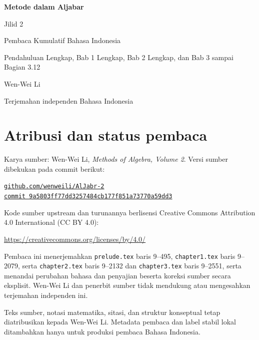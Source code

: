 \documentclass[
  colors=true,
  fontsetup=font-setup-id.tex,
  titlesetup=titles-setup.tex
]{AJbook2}
\theoremstyle{plain}
\theoremstyle{nonumberplain}
\numberwithin{equation}{section}
\numberwithin{figure}{section}
\begin{document}
\begin{titlepage}
  \centering
  \vspace*{0.16\textheight}
  {\Huge\bfseries Metode dalam Aljabar\par}
  \vspace{0.8em}
  {\LARGE Jilid 2\par}
  \vspace{1.8em}
  {\Large Pembaca Kumulatif Bahasa Indonesia\par}
  \vspace{0.6em}
  {\large Pendahuluan Lengkap, Bab 1 Lengkap, Bab 2 Lengkap, dan Bab 3 sampai Bagian 3.12\par}
  \vfill
  {\Large Wen-Wei Li\par}
  \vspace{0.6em}
  {\normalsize Terjemahan independen Bahasa Indonesia\par}
  \vspace*{0.10\textheight}
\end{titlepage}

\cleardoublepage
\thispagestyle{empty}
\section*{Atribusi dan status pembaca}
Karya sumber: Wen-Wei Li, \emph{Methods of Algebra, Volume 2}. Versi
sumber dibekukan pada commit berikut:
\begin{center}
  \small
  \href{https://github.com/wenweili/AlJabr-2}{\texttt{github.com/wenweili/AlJabr-2}}\\
  \href{https://github.com/wenweili/AlJabr-2/commit/9a5803ff77dd3257484cb177f851a73770a59dd3}{\texttt{commit 9a5803ff77dd3257484cb177f851a73770a59dd3}}
\end{center}
Kode sumber upstream dan turunannya berlisensi Creative Commons
Attribution 4.0 International (CC BY 4.0):
\begin{center}
  \small\url{https://creativecommons.org/licenses/by/4.0/}
\end{center}
Pembaca ini menerjemahkan
\texttt{prelude.tex} baris 9--495, \texttt{chapter1.tex} baris 9--2079,
serta \texttt{chapter2.tex} baris 9--2132 dan \texttt{chapter3.tex} baris
9--2551, serta menandai perubahan bahasa dan penyajian beserta koreksi sumber
secara eksplisit. Wen-Wei Li dan penerbit sumber tidak mendukung atau
mengesahkan terjemahan independen ini.

\medskip
Teks sumber, notasi matematika, sitasi, dan struktur konseptual tetap
diatribusikan kepada Wen-Wei Li. Metadata pembaca dan label stabil lokal
ditambahkan hanya untuk produksi pembaca Bahasa Indonesia.
\end{document}
